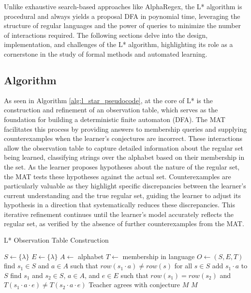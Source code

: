 \indent\indent Unlike exhaustive search-based approaches like AlphaRegex, the L* algorithm is procedural and always yields a proposal DFA in poynomial time, leveraging the structure of regular languages and the power of queries to minimize the number of interactions required. The following sections delve into the design, implementation, and challenges of the L* algorithm, highlighting its role as a cornerstone in the study of formal methods and automated learning.

\subsection{Algorithm}

\indent\indent As seen in Algorithm \ref{alg:l_star_pseudocode}, at the core of L* is the construction and refinement of an observation table, which serves as the foundation for building a deterministic finite automaton (DFA). The MAT facilitates this process by providing answers to membership queries and supplying counterexamples when the learner's conjectures are incorrect. These interactions allow the observation table to capture detailed information about the regular set being learned, classifying strings over the alphabet based on their membership in the set. As the learner proposes hypotheses about the nature of the regular set, the MAT tests these hypotheses against the actual set. Counterexamples are particularly valuable as they highlight specific discrepancies between the learner's current understanding and the true regular set, guiding the learner to adjust its hypothesis in a direction that systematically reduces these discrepancies. This iterative refinement continues until the learner's model accurately reflects the regular set, as verified by the absence of further counterexamples from the MAT. 

\begin{algorithm}
    \caption{L* Observation Table Construction}
    \label{alg:l_star_pseudocode}
    \begin{algorithmic}[1]
    \State $S \gets \{ \lambda \}$
    \State $E \gets \{ \lambda \}$
    \State $A \gets$ alphabet
    \State $T \gets$ membership in language
    \State $O \gets (S, E, T)$
    \Repeat
                \State find $s_1 \in S$ and $a \in A$
                \State such that $row(s_1 \cdot a) \neq row(s)$ for all $s \in S$
                \State add $s_1 \cdot a$ to $S$
            \EndIf
                \State find $s_1$ and $s_2 \in S$, $a \in A$, and $e \in E$
                \State such that $row(s_1) = row(s_2)$ and $T(s_1 \cdot a \cdot e) \neq T(s_2 \cdot a \cdot e)$
            \EndIf
        \EndWhile
    \Until Teacher agrees with conjecture $M$
    \State \Return $M$
    \end{algorithmic}
    \end{algorithm}

